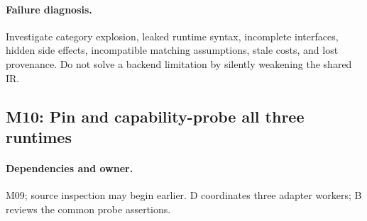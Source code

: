 \documentclass[11pt,a4paper]{article}
\begin{document}
\paragraph{Failure diagnosis.} Investigate category explosion, leaked
runtime syntax, incomplete interfaces, hidden side effects, incompatible
matching assumptions, stale costs, and lost provenance. Do not solve a
backend limitation by silently weakening the shared IR.

\subsection{M10: Pin and capability-probe all three runtimes}

\paragraph{Dependencies and owner.} M09; source inspection may begin earlier.
D coordinates three adapter workers; B reviews the common probe assertions.
\end{document}
